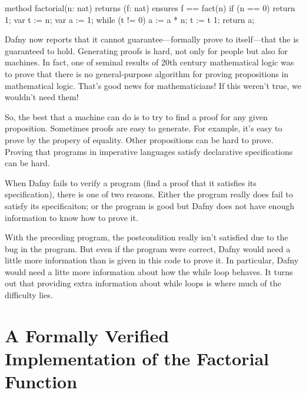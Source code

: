 \documentclass[letterpaper,10pt,english]{sphinxmanual}
\begin{document}
\begin{sphinxVerbatim}[commandchars=\\\{\}]
method factorial(n: nat) returns (f: nat)
    ensures f == fact(n)
\PYGZob{}
    if (n == 0)
    \PYGZob{}
        return 1;
    \PYGZcb{}
    var t := n;
    var a := 1;
    while (t !=  0)
    \PYGZob{}
        a := a * n;
        t := t \PYGZhy{} 1;
    \PYGZcb{}
    return a;
\PYGZcb{}
\end{sphinxVerbatim}

Dafny now reports that it cannot guarantee—formally prove to
itself—that the  is guaranteed to hold. Generating
proofs is hard, not only for people but also for machines. In fact,
one of seminal results of 20th century mathematical logic was to prove
that there is no general-purpose algorithm for proving propositions in
mathematical logic. That’s good news for mathematicians!  If this
weren’t true, we wouldn’t need them!

So, the best that a machine can do is to try to find a proof for any
given proposition. Sometimes proofs are easy to generate. For example,
it’s easy to prove  by the  propery of equality.
Other propositions can be hard to prove. Proving that programs in
imperative languages satisfy declarative specifications can be hard.

When Dafny fails to verify a program (find a proof that it satisfies
its specification), there is one of two reasons. Either the program
really does fail to satisfy its specificaiton; or the program is good
but Dafny does not have enough information to know how to prove it.

With the preceding program, the postcondition really isn’t satisfied
due to the bug in the program. But even if the program were correct,
Dafny would need a little more information than is given in this code
to prove it. In particular, Dafny would need a litte more information
about how the while loop behaves. It turns out that providing extra
information about while loops is where much of the difficulty lies.


\section{A Formally Verified Implementation of the Factorial Function}
\label{\detokenize{05-putting-it-together:a-formally-verified-implementation-of-the-factorial-function}}
\begin{sphinxVerbatim}[commandchars=\\\{\}]

\end{sphinxVerbatim}
\end{document}
